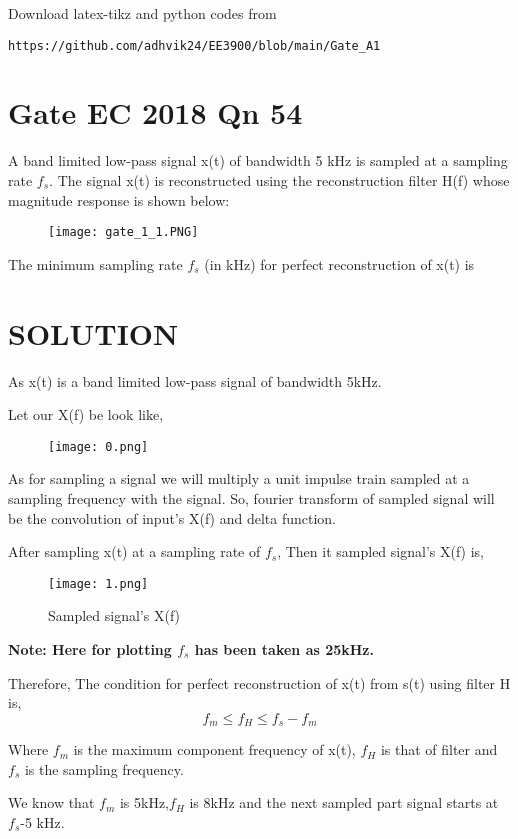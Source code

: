 \documentclass[journal,12pt,twocolumn]{IEEEtran}
\begin{document}
%
Download latex-tikz and python codes from 
%
\begin{lstlisting}
https://github.com/adhvik24/EE3900/blob/main/Gate_A1
\end{lstlisting}


\section{Gate EC 2018 Qn 54}
A band limited low-pass signal x(t) of bandwidth 5 kHz is sampled at a sampling rate $f_s$.
The signal x(t) is reconstructed using the reconstruction filter H(f) whose magnitude response is shown below:

\begin{figure}[htp]
    \centering
    \texttt{[image: gate\_1\_1.PNG]}
\end{figure}

The minimum sampling rate $f_s$ (in kHz) for perfect reconstruction of x(t) is
\section{SOLUTION}
As x(t) is a band limited low-pass signal of bandwidth 5kHz.

Let our X(f) be look like,
\begin{figure}[htp]
    \centering
    \texttt{[image: 0.png]}
\end{figure}

As for sampling a signal we will multiply a unit impulse train sampled at a sampling frequency with the signal. So, fourier transform of sampled signal will be the convolution of input's X(f) and delta function.

After sampling x(t) at a sampling rate of $f_s$, Then it sampled signal's X(f) is,
\begin{figure}[htp]
    \centering
    \texttt{[image: 1.png]}
    \caption{Sampled signal's X(f)}
\end{figure}

\textbf{Note: Here for plotting $f_s$ has been taken as 25kHz.}

Therefore, The condition for perfect reconstruction of x(t) from s(t) using filter H is,
$$f_m\le f_H\le f_s-f_m$$

Where $f_m$ is the maximum component frequency of x(t), $f_H$ is that of filter and $f_s$ is the sampling frequency.

We know that $f_m$ is 5kHz,$f_H$ is 8kHz and the next sampled part signal starts at $f_s$-5 kHz.
\end{document}
